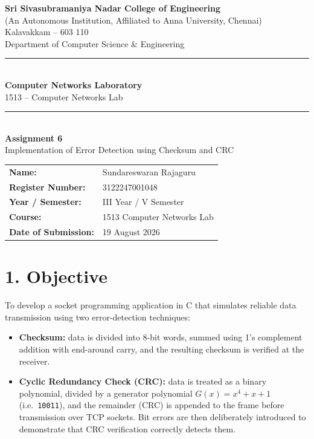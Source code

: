 \documentclass[11pt]{article}
\title{\vspace{-2cm}}
\date{}
\begin{document}
\begin{titlepage}
\centering
\vspace*{1cm}
{\large \textbf{Sri Sivasubramaniya Nadar College of Engineering}}\\
{\small (An Autonomous Institution, Affiliated to Anna University, Chennai)}\\
{\small Kalavakkam -- 603 110}\\[0.3cm]
{\small Department of Computer Science \& Engineering}\\[1.5cm]

\rule{\linewidth}{0.5mm}\\[0.4cm]
{\LARGE \textbf{Computer Networks Laboratory}}\\[0.3cm]
{\Large 1513 -- Computer Networks Lab}\\[0.4cm]
\rule{\linewidth}{0.5mm}\\[1.5cm]

{\huge \textbf{Assignment 6}}\\[0.4cm]
{\Large Implementation of Error Detection using Checksum and CRC}\\[2cm]

\begin{center}
\begin{tabular}{ll}
\textbf{Name:} & Sundareswaran Rajaguru \\[0.2cm]
\textbf{Register Number:} & 3122247001048 \\[0.2cm]
\textbf{Year / Semester:} & III Year / V Semester \\[0.2cm]
\textbf{Course:} & 1513 Computer Networks Lab \\[0.2cm]
\textbf{Date of Submission:} & 19 August 2026 \\[0.2cm]
\end{tabular}
\end{center}

\vfill
\end{titlepage}

\section*{1. Objective}
To develop a socket programming application in C that simulates reliable data transmission using
two error-detection techniques:
\begin{itemize}
  \item \textbf{Checksum:} data is divided into 8-bit words, summed using 1's complement addition
        with end-around carry, and the resulting checksum is verified at the receiver.
  \item \textbf{Cyclic Redundancy Check (CRC):} data is treated as a binary polynomial, divided by
        a generator polynomial $G(x) = x^4+x+1$ (i.e.\ \texttt{10011}), and the remainder (CRC) is
        appended to the frame before transmission over TCP sockets. Bit errors are then
        deliberately introduced to demonstrate that CRC verification correctly detects them.
\end{itemize}
\end{document}
